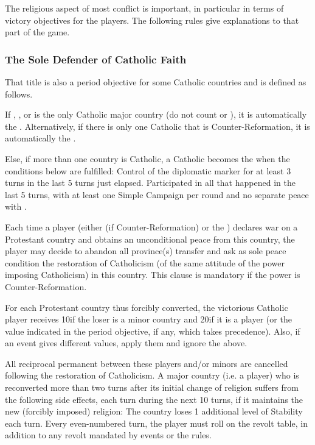 The religious aspect of most conflict is important, in particular in terms of
victory objectives for the players. The following rules give explanations to
that part of the game.


\subsubsection{The Sole Defender of Catholic Faith}\label{chSpecific:Catholic
  Faith}
\aparag That title is also a period objective for some Catholic countries and
is defined as follows.

\aparag If \FRA, \SPA, \ENG or \POL is the only Catholic major country (do not
count \POR or \VEN), it is automatically the .
\bparag Alternatively, if there is only one Catholic \MAJ that is
Counter-Reformation, it is automatically the .

\aparag Else, if more than one country is Catholic, a Catholic \MAJ becomes
the  when the conditions below are
fulfilled:
\bparag Control of the  diplomatic marker for at least 3 turns
in the last 5 turns just elapsed.
\bparag Participated in all  that happened in the last 5
turns, with at least one Simple Campaign per round and no separate peace with
\TUR.


 Each time a player
(either \SPA (if Counter-Reformation) or the ) declares war on a Protestant country and obtains an
unconditional peace from this country, the player may decide to abandon all
province(s) transfer and ask as sole peace condition the restoration of
Catholicism (of the same attitude of the power imposing Catholicism) in this
country.
\bparag This clause is mandatory if the power is Counter-Reformation.

For each Protestant country thus forcibly converted, the victorious Catholic
player receives 10\VP if the loser is a minor country and 20\VP if it is a
player (or the value indicated in the period objective, if any, which takes
precedence).  Also, if an event gives different values, apply them and ignore
the above.

All reciprocal permanent \CB between these players and/or minors are cancelled
following the restoration of Catholicism.  A major country (i.e. a player) who
is reconverted more than two turns after its initial change of religion
suffers from the following side effects, each turn during the next 10 turns,
if it maintains the new (forcibly imposed) religion:
\bparag The country loses 1 additional level of Stability each turn.
\bparag Every even-numbered turn, the player must roll on the revolt table, in
addition to any revolt mandated by events or the rules.

